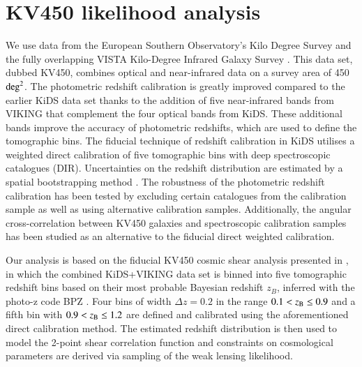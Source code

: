 \documentclass{aa}
\begin{document}
\section{KV450 likelihood analysis}
\label{sec:results}
We use data from the European Southern Observatory's Kilo Degree Survey \citep[KiDS; ][]{kuijken15, kuijken19,dejong15,dejong17} and the fully overlapping VISTA Kilo-Degree Infrared Galaxy Survey \citep[VIKING; ][]{2013Msngr.154...32E}. This data set, dubbed KV450, combines optical and near-infrared data on a survey area of 450 ${\rm deg}^2$. The photometric redshift calibration is greatly improved compared to the earlier KiDS data set \citep{hildebrandt17} thanks to the addition of five near-infrared bands from VIKING that complement the four optical bands from KiDS. These additional bands improve the accuracy of photometric redshifts, which are used to define the tomographic bins. The fiducial technique of redshift calibration in KiDS utilises a weighted direct calibration of five tomographic bins with deep spectroscopic catalogues (DIR). Uncertainties on the redshift distribution are estimated by a spatial bootstrapping method \citep{hildebrandt18}. The robustness of the photometric redshift calibration has been tested by excluding certain catalogues from the calibration sample as well as using alternative calibration samples. Additionally, the angular cross-correlation between KV450 galaxies and spectroscopic calibration samples has been studied as an alternative to the fiducial direct weighted calibration.

Our analysis is based on the fiducial KV450 cosmic shear analysis presented in \cite{hildebrandt18}, in which the combined KiDS+VIKING data set \citep{2019A&A...632A..34W} is binned into five tomographic redshift bins based on their most probable Bayesian redshift $z_B$, inferred with the photo-z code {\sc BPZ} \citep{2000ApJ...536..571B}. Four bins of width $\Delta z = 0.2$ in the range $0.1 < z_{\rm B} \leq 0.9$ and a fifth bin with $0.9 < z_{\rm B} \leq 1.2$ are defined and calibrated using the aforementioned direct calibration method. The estimated redshift distribution is then used to model the 2-point shear correlation function and constraints on cosmological parameters are derived via sampling of the weak lensing likelihood. 
\end{document}
